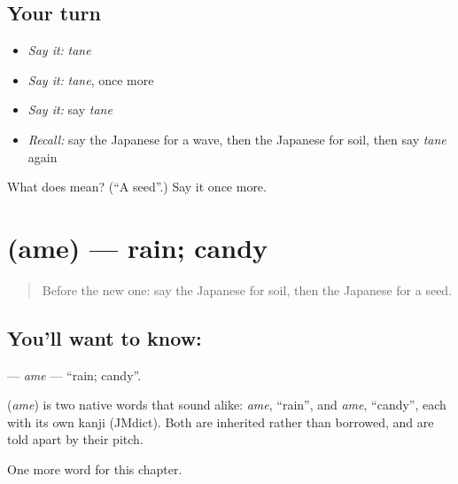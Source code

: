 \subsection*{Your turn}
\begin{itemize}
\raggedright
  \item \emph{Say it:} \emph{tane}
  \item \emph{Say it:} \emph{tane}, once more
  \item \emph{Say it:} say \emph{tane}
  \item \emph{Recall:} say the Japanese for a wave, then the Japanese for soil, then say \emph{tane} again
\end{itemize}

\begin{tcolorbox}[breakable,colback=teal!4,colframe=teal!35!black,title={Before you move on}]
What does  mean? (\textquotedblleft{}A seed\textquotedblright{}.) Say it once more.
\end{tcolorbox}
\section[\texorpdfstring{\ja{あめ} (ame)}{あめ (ame)}]{ (ame) — rain; candy}

\label{lesson:JA-C44-ame}



\begin{quote}
Before the new one: say the Japanese for soil, then the Japanese for a seed.
\end{quote}

\subsection*{You'll want to know: }
\textbf{} — \emph{ame} — \textquotedblleft{}rain; candy\textquotedblright{}.

\begin{cousinweb}
\textbf{} (\emph{ame}) is two native words that sound alike: \emph{ame}, \textquotedblleft{}rain\textquotedblright{}, and \emph{ame}, \textquotedblleft{}candy\textquotedblright{}, each with its own kanji (JMdict). Both are inherited rather than borrowed, and are told apart by their pitch.
\end{cousinweb}

\begin{grammarlens}[title={What you've built}]
One more word for this chapter.
\end{grammarlens}

